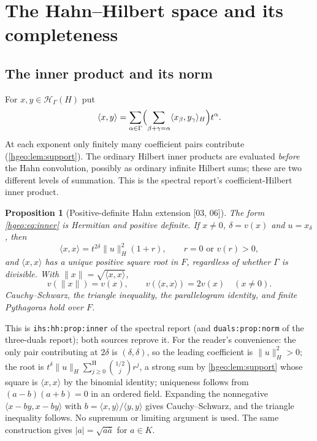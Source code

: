 \documentclass[11pt,letterpaper]{article}
\numberwithin{equation}{section}
\newtheorem{proposition}[proposition]{Proposition}
\theoremstyle{definition}
\theoremstyle{remark}
\newcommand{\F}{F}
\newcommand{\K}{K}
\newcommand{\HH}[1]{\mathscr H_\Gamma(#1)}
\newcommand{\ip}[2]{\langle #1,#2\rangle}
\newcommand{\norm}[1]{\lVert #1\rVert}
\newcommand{\abs}[1]{\lvert #1\rvert}
\newcommand{\sH}{\mathop{\sum}\nolimits^{\mathrm H}}
\newcommand{\src}[1]{\textup{\textsf{\small[#1]}}}
\newcommand{\replabel}[1]{\nolinkurl{#1}}
\begin{document}
\section{The Hahn--Hilbert space and its completeness}
\label{hgeo:sec:construction}

\subsection{The inner product and its norm}
For $x,y\in\HH{H}$ put
\begin{equation}\label{hgeo:eq:inner}
 \ip{x}{y}=\sum_{\alpha\in\Gamma}
   \Bigl(\sum_{\beta+\gamma=\alpha}\ip{x_\beta}{y_\gamma}_H\Bigr)t^{\alpha}.
\end{equation}
At each exponent only finitely many coefficient pairs contribute
(\cref{hgeo:lem:support}). The ordinary Hilbert inner products are evaluated
\emph{before} the Hahn convolution, possibly as ordinary infinite Hilbert
sums; these are two different levels of summation. This is the spectral
report's coefficient-Hilbert inner product.

\begin{proposition}[Positive-definite Hahn extension
\src{03, 06}]\label{hgeo:prop:inner}
The form \eqref{hgeo:eq:inner} is Hermitian and positive definite. If
$x\ne0$, $\delta=v(x)$ and $u=x_\delta$, then
\[
 \ip{x}{x}=t^{2\delta}\norm{u}_H^2(1+r),\qquad r=0\text{ or }v(r)>0,
\]
and $\ip{x}{x}$ has a unique positive square root in $\F$, regardless of
whether $\Gamma$ is divisible. With $\norm{x}=\sqrt{\ip{x}{x}}$,
\[
 v(\norm{x})=v(x),\qquad v(\ip{x}{x})=2v(x)\quad(x\ne0).
\]
Cauchy--Schwarz, the triangle inequality, the parallelogram identity, and
finite Pythagoras hold over $\F$.
\end{proposition}

This is \replabel{ihs:hh:prop:inner} of the spectral report (and
\replabel{duals:prop:norm} of the three-duals report); both sources reprove
it. For the reader's convenience: the only pair contributing at $2\delta$ is
$(\delta,\delta)$, so the leading coefficient is $\norm{u}_H^2>0$; the root
is $t^\delta\norm{u}_H\sH_{j\ge0}\binom{1/2}{j}r^j$, a strong sum by
\cref{hgeo:lem:support} whose square is $\ip{x}{x}$ by the binomial identity;
uniqueness follows from $(a-b)(a+b)=0$ in an ordered field. Expanding the
nonnegative $\ip{x-by}{x-by}$ with $b=\ip{x}{y}/\ip{y}{y}$ gives
Cauchy--Schwarz, and the triangle inequality follows. No supremum or limiting
argument is used. The same construction gives $\abs a=\sqrt{a\bar a}$ for
$a\in\K$.
\end{document}
